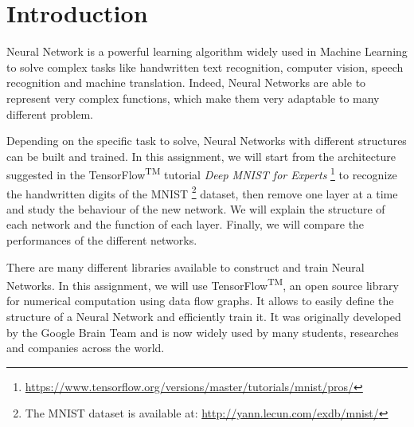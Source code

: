 \section{Introduction}
\label{sec:introduction}

Neural Network is a powerful learning algorithm widely used in Machine Learning to solve complex tasks like handwritten text recognition, computer vision, speech recognition and machine translation.
Indeed, Neural Networks are able to represent very complex functions, which make them very adaptable to many different problem.

Depending on the specific task to solve, Neural Networks with different structures can be built and trained.
In this assignment, we will start from the architecture suggested in the TensorFlow\textsuperscript{TM} tutorial \textit{Deep MNIST for Experts} \footnote{\url{https://www.tensorflow.org/versions/master/tutorials/mnist/pros/}} to recognize the handwritten digits of the MNIST \footnote{The MNIST dataset is available at: \url{http://yann.lecun.com/exdb/mnist/}} dataset, then remove one layer at a time and study the behaviour of the new network.
We will explain the structure of each network and the function of each layer.
Finally, we will compare the performances of the different networks.

There are many different libraries available to construct and train Neural Networks.
In this assignment, we will use TensorFlow\textsuperscript{TM}, an open source library for numerical computation using data flow graphs.
It allows to easily define the structure of a Neural Network and efficiently train it.
It was originally developed by the Google Brain Team and is now widely used by many students, researches and companies across the world.
